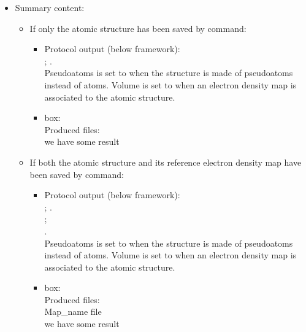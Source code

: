 \begin{itemize}
  \item Summary content:
   \begin{itemize}
    \item If only the atomic structure has been saved by  command:

   \begin{itemize}
     \item Protocol output (below \scipion framework):\\ ; .\\Pseudoatoms is set to  when the structure is made of pseudoatoms instead of atoms. Volume is set to  when an electron density map is associated to the atomic structure.
     \item {} box:\\Produced files:\\we have some result
    \end{itemize}
    
   \item If both the atomic structure and its reference electron density map have been saved by  command: 
   
   \begin{itemize}
     \item Protocol output (below \scipion framework):\\
      ; .\\
      ;\\ .\\Pseudoatoms is set to  when the structure is made of pseudoatoms instead of atoms. Volume is set to  when an electron density map is associated to the atomic structure.
     \item {} box:\\Produced files:\\Map\_name file\\we have some result
    \end{itemize}
    
   \end{itemize} 
  
 \end{itemize}

